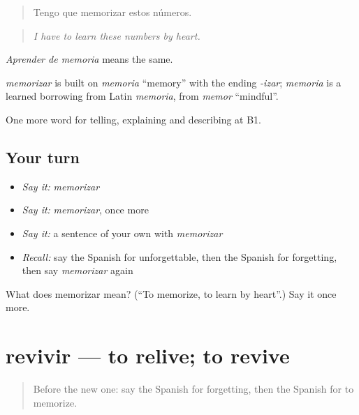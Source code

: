 \begin{quote}
Tengo que memorizar estos números.
\end{quote}

\begin{quote}
\emph{I have to learn these numbers by heart.}
\end{quote}

\emph{Aprender de memoria} means the same.

\begin{cousinweb}
\emph{memorizar} is built on \emph{memoria} \textquotedblleft{}memory\textquotedblright{} with the ending \emph{-izar}; \emph{memoria} is a learned borrowing from Latin \emph{memoria}, from \emph{memor} \textquotedblleft{}mindful\textquotedblright{}.
\end{cousinweb}

\begin{grammarlens}[title={What you've built}]
One more word for telling, explaining and describing at B1.
\end{grammarlens}

\subsection*{Your turn}
\begin{itemize}
\raggedright
  \item \emph{Say it:} \emph{memorizar}
  \item \emph{Say it:} \emph{memorizar}, once more
  \item \emph{Say it:} a sentence of your own with \emph{memorizar}
  \item \emph{Recall:} say the Spanish for unforgettable, then the Spanish for forgetting, then say \emph{memorizar} again
\end{itemize}

\begin{tcolorbox}[breakable,colback=teal!4,colframe=teal!35!black,title={Before you move on}]
What does memorizar mean? (\textquotedblleft{}To memorize, to learn by heart\textquotedblright{}.) Say it once more.
\end{tcolorbox}
\section[revivir]{revivir — to relive; to revive}

\label{lesson:ES-C764-revivir}



\begin{quote}
Before the new one: say the Spanish for forgetting, then the Spanish for to memorize.
\end{quote}

